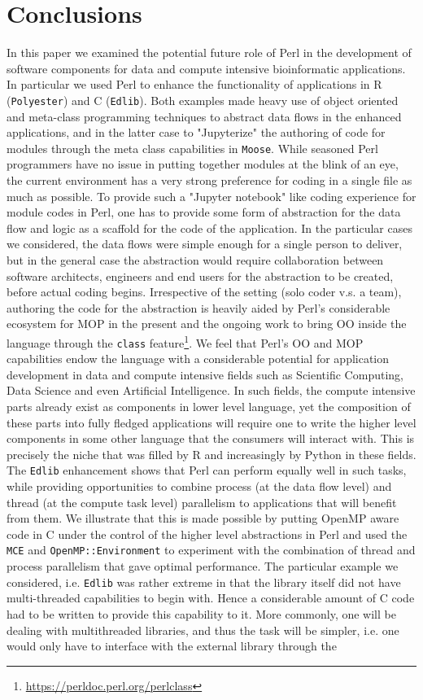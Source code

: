 \documentclass[10pt]{article}
\begin{document}
\section{Conclusions}
In this paper we examined the potential future role of Perl in the development of software components for data and compute intensive bioinformatic applications. In particular we used Perl to enhance the functionality of applications in R (\texttt{Polyester}) and C (\texttt{Edlib}). Both examples made heavy use of object oriented and meta-class programming techniques to abstract data flows in the enhanced applications, and in the latter case to "Jupyterize" the authoring of code for modules through the meta class capabilities in \texttt{Moose}. While seasoned Perl programmers have no issue in putting together modules at the blink of an eye, the current environment has a very strong preference for coding in a single file as much as possible. To provide such a  "Jupyter notebook" like coding experience for module codes in Perl, one has to provide some form of abstraction for the data flow and logic  as a scaffold for the code of the application. In the particular cases we considered, the data flows were simple enough for a single person to deliver, but in the general case the abstraction would require collaboration between software architects, engineers and end users for the abstraction to be created, before actual coding begins. Irrespective of the setting (solo coder v.s. a team), authoring the code for the abstraction is heavily aided by Perl's considerable ecosystem for MOP in the present and the ongoing work to bring OO inside the language through the \texttt{class} feature\footnote{\url{https://perldoc.perl.org/perlclass}}. We feel that Perl's OO and MOP capabilities endow the language with a considerable potential for application development in data and compute intensive fields such as Scientific Computing, Data Science and even Artificial Intelligence. In such fields, the compute intensive parts already exist as components in lower level language, yet the composition of these parts into fully fledged applications will require one to write the higher level components in some other language that the consumers will interact with. This is precisely the niche that was filled by R and increasingly by Python in these fields.  The \texttt{Edlib} enhancement shows that Perl can perform equally well in such tasks, while providing opportunities to combine process (at the data flow level) and thread (at the compute task level) parallelism to applications that will benefit from them. We illustrate that this is made possible by putting  OpenMP aware code in C under the control of the higher level abstractions in Perl and  used the \texttt{MCE} and \texttt{OpenMP::Environment} to experiment with the combination of thread and process parallelism that gave optimal performance. The particular example we considered, i.e. \texttt{Edlib} was rather extreme in that the library itself did not have multi-threaded capabilities to begin with. Hence a considerable amount of C code had to be written to provide this capability to it. More commonly, one will be dealing with multithreaded libraries, and thus the task will be simpler, i.e. one would only have to interface with the external library through the 
\end{document}

